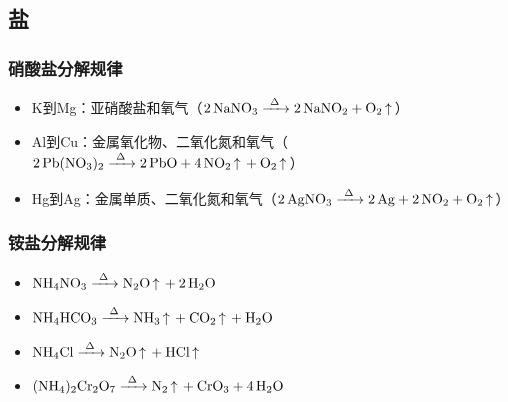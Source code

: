 \documentclass[a4paper]{article}
\begin{document}
	\subsection{盐}
	\subsubsection{硝酸盐分解规律}
	\begin{itemize}
		\item K到Mg：亚硝酸盐和氧气（$\ce{2NaNO3 ->[\Delta] 2NaNO2 + O2 ^}$）
		\item Al到Cu：金属氧化物、二氧化氮和氧气（$\ce{2Pb(NO3)2 ->[\Delta] 2PbO + 4NO2 ^ + O2 ^}$）
		\item Hg到Ag：金属单质、二氧化氮和氧气（$\ce{2AgNO3 ->[\Delta] 2Ag + 2NO2 + O2 ^}$）
	\end{itemize}
	\subsubsection{铵盐分解规律}
	\begin{itemize}
		\item $\ce{NH4NO3 ->[\Delta] N2O ^ + 2H2O}$
		\item $\ce{NH4HCO3 ->[\Delta] NH3 ^ + CO2 ^ + H2O}$
		\item $\ce{NH4Cl ->[\Delta] N2O ^ + HCl ^}$
		\item $\ce{(NH4)2Cr2O7 ->[\Delta] N2 ^ + CrO3 + 4H2O}$
	\end{itemize}

	
	
\end{document}
